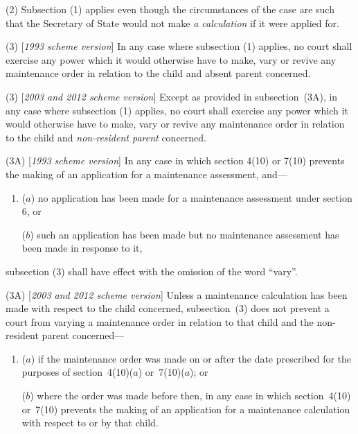 \documentclass[12pt,a4paper]{article}
\begin{document}
(2) Subsection (1)  applies even though the circumstances of the case are such that
the 
Secretary of State  %
would not make 
\emph{a calculation}  %
if it were applied for.

(3) [\emph{1993 scheme version}] In any case where subsection (1)  applies, no court shall exercise any power which it would otherwise have to make, vary or revive any maintenance order in relation to the child and absent parent concerned.

(3) [\emph{2003 and 2012 scheme version}] 
Except as provided in subsection~(3A),  %
in any case where subsection (1)  applies, no court shall exercise any power which it would otherwise have to make, vary or revive any maintenance order in relation to the child and 
\emph{non-resident parent}  %
concerned.

(3A) [\emph{1993 scheme version}] In any case in which section 4(10) or 7(10) prevents the making of an application for a maintenance assessment, and—
\begin{enumerate}\item[]
($a$) no application has been made for a maintenance assessment under section 6, or

($b$) such an application has been made but no maintenance assessment has been made in response to it,
\end{enumerate}
subsection (3) shall have effect with the omission of the word “vary”.

(3A) [\emph{2003 and 2012 scheme version}] Unless a maintenance calculation has been made with respect to the child concerned, subsection~(3)  does not prevent a court from varying a maintenance order in relation to that child and the non-resident parent concerned—
\begin{enumerate}\item[]
($a$) if the maintenance order was made on or after the date prescribed for the purposes of section~4(10)($a$)  or~7(10)($a$); or

($b$) where the order was made before then, in any case in which section~4(10)  or~7(10)  prevents the making of an application for a maintenance calculation with respect to or by that child.
\end{enumerate}
\end{document}
